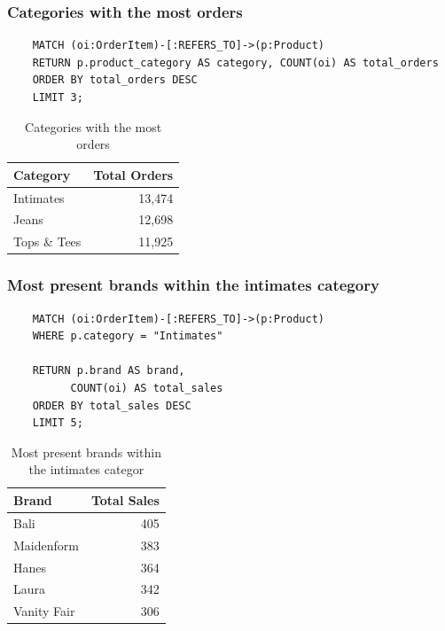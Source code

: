 \documentclass[a4paper,12pt]{article}
\begin{document}
  \subsubsection{Categories with the most orders}
  \begin{verbatim}  
    MATCH (oi:OrderItem)-[:REFERS_TO]->(p:Product)
    RETURN p.product_category AS category, COUNT(oi) AS total_orders
    ORDER BY total_orders DESC
    LIMIT 3;
  \end{verbatim}
  \begin{table}[h!]
    \centering
    \caption{Categories with the most orders}
    \label{tab:total_orders_category}
    \begin{tabular}{l r}
        \toprule
        \textbf{Category} & \textbf{Total Orders} \\
        \midrule
        Intimates     & 13,474 \\
        Jeans         & 12,698 \\
        Tops \& Tees  & 11,925 \\
        \bottomrule
    \end{tabular}
\end{table}

   \subsubsection{Most present brands within the intimates category}
   \begin{verbatim}
    MATCH (oi:OrderItem)-[:REFERS_TO]->(p:Product)
    WHERE p.category = "Intimates"

    RETURN p.brand AS brand, 
          COUNT(oi) AS total_sales
    ORDER BY total_sales DESC
    LIMIT 5;
    \end{verbatim}

    \begin{table}[h!]
      \centering
      \caption{Most present brands within the intimates categor}
      \label{tab:total_sales}
      \begin{tabular}{l r}
          \toprule
          \textbf{Brand}     & \textbf{Total Sales} \\
          \midrule
          Bali           & 405 \\
          Maidenform    & 383 \\
          Hanes         & 364 \\
          Laura         & 342 \\
          Vanity Fair   & 306 \\
          \bottomrule
      \end{tabular}
  \end{table}
\end{document}
